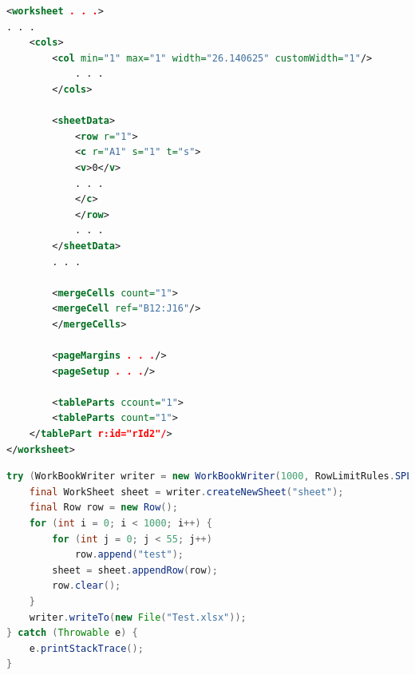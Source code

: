\documentclass[14pt]{matmex-diploma}
\begin{document}
\begin{lstlisting}[language=XML, style=basic, caption={Пример файла worksheet.xml},captionpos=b, label=list2]
<worksheet . . .>
. . .
    <cols>
        <col min="1" max="1" width="26.140625" customWidth="1"/>
            . . .
        </cols>
        
        <sheetData>
            <row r="1">
            <c r="A1" s="1" t="s">
            <v>0</v>
            . . .
            </c>
            </row>
            . . .
        </sheetData>
        . . .
        
        <mergeCells count="1">
        <mergeCell ref="B12:J16"/>
        </mergeCells>
        
        <pageMargins . . ./>
        <pageSetup . . ./>
        
        <tableParts ccount="1">
        <tableParts count="1">
    </tablePart r:id="rId2"/>
</worksheet>
\end{lstlisting}

\begin{lstlisting}[language=Java, style=basic, caption={Пример создания простого документа XLSX с помощью библиотеки oxml-doc}, captionpos=b, label=java1]
try (WorkBookWriter writer = new WorkBookWriter(1000, RowLimitRules.SPLIT)) {
    final WorkSheet sheet = writer.createNewSheet("sheet");
    final Row row = new Row();
    for (int i = 0; i < 1000; i++) {
        for (int j = 0; j < 55; j++)
            row.append("test");
        sheet = sheet.appendRow(row);
        row.clear();
    }
    writer.writeTo(new File("Test.xlsx"));
} catch (Throwable e) {
    e.printStackTrace();
}
\end{lstlisting}
\end{document}
